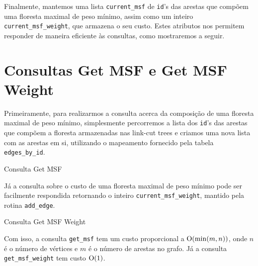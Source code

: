 Finalmente, mantemos uma lista \texttt{current\_msf} de \texttt{id}'s das arestas que compõem uma floresta maximal de peso mínimo, assim como um inteiro \texttt{current\_msf\_weight}, que armazena o seu custo. Estes atributos nos permitem responder de maneira eficiente às consultas, como mostraremos a seguir.

\section{Consultas Get MSF e Get MSF Weight}
\label{sec:imsf-get-msf}

Primeiramente, para realizarmos a consulta acerca da composição de uma floresta maximal de peso mínimo, simplesmente percorremos a lista dos \texttt{id}'s das arestas que compõem a floresta armazenadas nas link-cut trees e criamos uma nova lista com as arestas em si, utilizando o mapeamento fornecido pela tabela \texttt{edges\_by\_id}.

\begin{algorithm}[h!]
    \caption{Consulta Get MSF}\label{imsf-get-msf}
    \begin{algorithmic}[1]
        \EndFor
        \State {}
        \EndFunction
    \end{algorithmic}
\end{algorithm}

Já a consulta sobre o custo de uma floresta maximal de peso mínimo pode ser facilmente respondida retornando o inteiro \texttt{current\_msf\_weight}, mantido pela rotina \texttt{add\_edge}.

\begin{algorithm}[h!]
    \caption{Consulta Get MSF Weight}\label{imsf-get-msf-weight}
    \begin{algorithmic}[1]
        \State {}
        \EndFunction
    \end{algorithmic}
\end{algorithm}

Com isso, a consulta \texttt{get\_msf} tem um custo proporcional a $\mathrm{O}(\min(m, n))$, onde $n$ é o número de vértices e $m$ é o número de arestas no grafo. Já a consulta \texttt{get\_msf\_weight} tem custo $\mathrm{O}(1)$.

